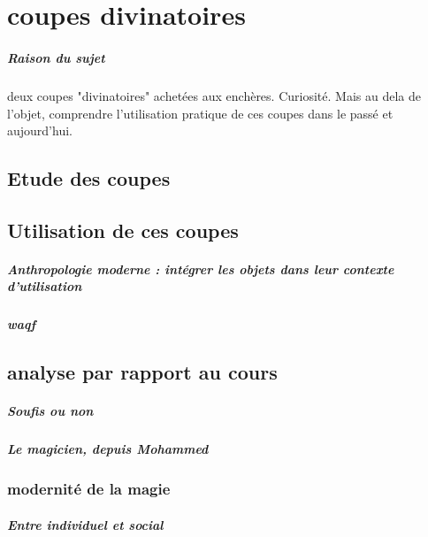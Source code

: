\chapter{coupes divinatoires}

\paragraph{Raison du sujet} deux coupes "divinatoires" achetées aux enchères. Curiosité. Mais au dela de l'objet, comprendre l'utilisation pratique de ces coupes dans le passé et aujourd'hui. 

\section{Etude des coupes}

\section{Utilisation de ces coupes}

\paragraph{Anthropologie moderne : intégrer les objets dans leur contexte d'utilisation}


\paragraph{waqf}



\section{analyse par rapport au cours}

\paragraph{Soufis ou non}

\paragraph{Le magicien, depuis Mohammed}


\subsection{modernité de la magie}

\paragraph{Entre individuel et social} 

